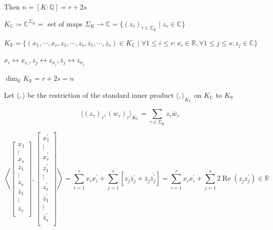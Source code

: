 \documentclass[openany]{amsbook}
\numberwithin{section}{chapter}
\theoremstyle{definition}
\begin{document}
Then \(n = [K : \mathbb{Q}] = r + 2s\) 

\(K_\mathbb{C} \coloneqq \mathbb{C}^{\Sigma_K} =\) set of maps \(\Sigma_K \to \mathbb{C} = \{ (z_\tau)_{\tau \in \Sigma_K} \mid z_\tau \in \mathbb{C} \} \) 

\(K_\mathbb{R} = \{ (x_1, \cdots , x_r, z_1, \cdots , z_s, \overline{z}_1, \cdots , \overline{z}_s) \in K_\mathbb{C} \mid \forall 1 \leq i \leq r : x_i \in \mathbb{R}, \forall 1 \leq j \leq s : z_j\in \mathbb{C} \} \) 

\(x_i \leftrightarrow x_{e_i}, z_j \leftrightarrow z_{\sigma_j}, \overline{z}_j \leftrightarrow z_{\overline{\sigma}_j}\) 

\(\dim_\mathbb{R} K_\mathbb{R} = r + 2s = n\) 

Let \(\langle , \rangle \) be the restriction of the standard inner product \(\langle , \rangle_{K_\mathbb{C}}\) on \(K_\mathbb{C}\) to \(K_\mathbb{R}\) 

\[
    \langle (z_\tau)_\tau, (w_\tau)_\tau \rangle _{K_\mathbb{C}} = \sum_{\tau \in \Sigma_K} z_\tau \overline{w}_\tau
\]

\[
    \left\langle \begin{bmatrix}
         x_1 \\
         \vdots \\
         x_r \\
         z_1 \\
         \vdots \\
         z_s \\
         \overline{z}_1 \\
         \vdots \\
         \overline{z}_s \\
    \end{bmatrix}, \begin{bmatrix}
         x_1^{\prime}  \\
         \vdots \\
         x_r^{\prime}  \\
         z_1^{\prime}  \\
         \vdots \\
         z_s^{\prime}  \\
         \overline{z}_1^{\prime}  \\
         \vdots \\
         \overline{z}_s^{\prime}  \\
    \end{bmatrix} \right\rangle = \sum_{i=1}^r x_i x_i^{\prime} + \sum_{j=1}^s [z_j \overline{z}_j^{\prime} + \overline{z}_j \overline{\overline{z}_j^{\prime} } ] = \sum_{i=1}^r x_i x_i^{\prime} + \sum_{j=1}^s 2\operatorname{Re}(z_j z_j^{\prime}) \in \mathbb{R} 
\]
\end{document}
